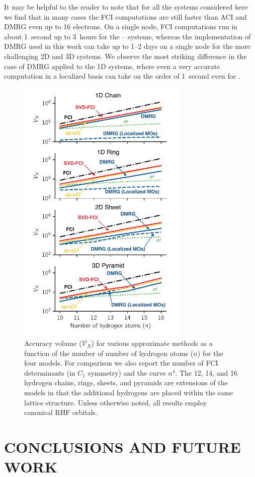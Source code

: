 \documentclass[aip,jcp,amsmath,amssymb, reprint]{revtex4-1}
\newcommand*{\ncomp}{\mathcal{V}_X}
\begin{document}
It may be helpful to the reader to note that for all the systems considered here we find that in many cases the FCI computations are still faster than ACI and DMRG even up to 16 electrons.
On a single node, FCI computations run in about 1~second up to 3~hours for the -- systems, whereas the implementation of DMRG used in this work can take up to 1--2 days on a single node for the more challenging 2D and 3D systems. We observe the most striking difference in the case of DMRG applied to the 1D systems, where even a very accurate computation in a localized basis can take on the order of 1~second even for .
\begin{figure}[h!]
\centering
\includegraphics[width=3.2in]{figure_7.pdf}
\caption{Accuracy volume ($\ncomp$) for various approximate methods as a function of the number of number of hydrogen atoms ($n$) for the four  models.
For comparison we also report the number of FCI determinants (in $C_1$ symmetry) and the curve $n^4$.
The 12, 14, and 16 hydrogen chains, rings, sheets, and pyramids are extensions of the  models in that the additional hydrogens are placed within the same lattice structure.
Unless otherwise noted, all results employ canonical RHF orbitals.}
\label{fig:h10compression_n}
\end{figure}
    
\section{\label{sec:conclusions}CONCLUSIONS AND FUTURE WORK}
\end{document}
